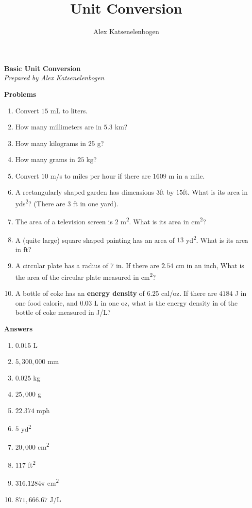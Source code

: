 \documentclass{article}
\title{Unit Conversion}
\author{Alex Katsenelenbogen}
\begin{document}
\begin{center}
      \Large\textbf{Basic Unit Conversion}\\
      \large\textit{Prepared by Alex Katsenelenbogen}
   \end{center}


\textbf{Problems}
\begin{enumerate}

\item Convert $15$ mL to liters.

\item How many millimeters are in $5.3$ km?

\item How many kilograms in $25$ g?

\item How many grams in $25$ kg?

\item Convert $10$ m/s to miles per hour if  there are $1609$ m in a mile.

\item A rectangularly shaped garden has dimensions  $3$ft by $15$ft. What is its area in yds\textsuperscript{2}? (There are 3 ft in one yard).

\item The area of a television screen is $2$ m\textsuperscript{2}. What is its area in cm\textsuperscript{2}? 

\item A (quite large) square shaped painting has an area of $13$ yd\textsuperscript{2}. What is its area in ft?

\item A circular plate has a radius of $7$ in. If there are $2.54$ cm in an inch, What is the area of the circular plate measured in cm\textsuperscript{2}?

\item A bottle of coke has an \textbf{energy density} of $6.25$ cal/oz. If there are $4184$ J in one food calorie, and $0.03$ L in one oz, what is the energy density in of the bottle of coke measured in J/L?

\end{enumerate}

\pagebreak

\textbf{Answers}

\begin{enumerate}

\item $0.015$ L
\item $5,300,000$ mm
\item $0.025$ kg
\item $25,000$ g
\item $22.374$ mph
\item $5$ yd\textsuperscript{2}
\item $20,000$ cm\textsuperscript{2}
\item $117$ ft\textsuperscript{2}
\item $316.1284\pi$ cm\textsuperscript{2}
\item $871,666.67$ J/L
\end{enumerate}
\end{document}
